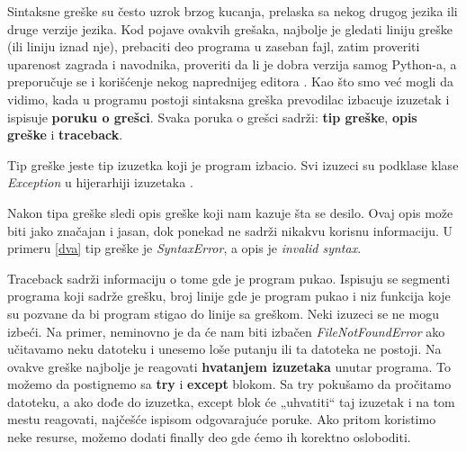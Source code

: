 \documentclass[a4paper]{article}
\begin{document}
Sintaksne greške su često uzrok brzog kucanja, prelaska sa nekog drugog jezika ili druge verzije jezika. Kod pojave ovakvih grešaka, najbolje je gledati liniju greške (ili liniju iznad nje), prebaciti deo programa u zaseban fajl, zatim proveriti uparenost zagrada i navodnika, proveriti da li je dobra verzija samog Python-a, a preporučuje se i korišćenje nekog naprednijeg editora \cite{proPyDeb}.
Kao što smo već mogli da vidimo, kada u programu postoji sintaksna greška prevodilac izbacuje izuzetak i ispisuje \textbf{poruku o grešci}. Svaka poruka o grešci sadrži: \textbf{tip greške}, \textbf{opis greške} i \textbf{traceback}.

Tip greške jeste tip izuzetka koji je program izbacio. Svi izuzeci su podklase klase \emph{Exception} u hijerarhiji izuzetaka \cite{excDocPyt}.

Nakon tipa greške sledi opis greške koji nam kazuje šta se desilo. Ovaj opis može biti jako značajan i jasan, dok ponekad ne sadrži nikakvu korisnu informaciju. U primeru \ref{dva} tip greške je \emph{SyntaxError}, a opis je \emph{invalid syntax}.

Traceback sadrži informaciju o tome gde je program pukao. Ispisuju se segmenti programa koji sadrže grešku, broj linije gde je program pukao i niz funkcija koje su pozvane da bi program stigao do linije sa greškom.
Neki izuzeci se ne mogu izbeći. Na primer, neminovno je da će nam biti izbačen \emph{FileNotFoundError} ako učitavamo neku datoteku i unesemo loše putanju ili ta datoteka ne postoji. Na ovakve greške najbolje je reagovati \textbf{hvatanjem izuzetaka} unutar programa. To možemo da postignemo sa \textbf{try} i \textbf{except} blokom. Sa try pokušamo da pročitamo datoteku, a ako dođe do izuzetka, except blok će „uhvatiti“ taj izuzetak i na tom mestu reagovati, najčešće ispisom odgovarajuće poruke. Ako pritom koristimo neke resurse, možemo dodati finally deo gde ćemo ih korektno osloboditi.
\end{document}
